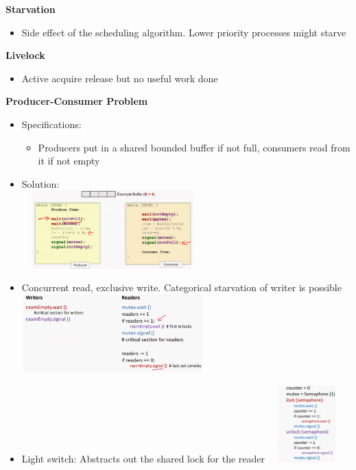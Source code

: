 \documentclass[10pt, landscape]{article}
\begin{document}
\begin{multicols}{4}
\textbf{Starvation}
\begin{itemize}
    \item Side effect of the scheduling algorithm. Lower priority processes might starve
\end{itemize}

\textbf{Livelock}
\begin{itemize}
    \item Active acquire release but no useful work done 
\end{itemize}
 
\textbf{Producer-Consumer Problem} \\
\begin{itemize}
    \item Specifications:
    \begin{itemize}
        \item Producers put in a shared bounded buffer if not full, consumers read from it if not empty
    \end{itemize}
    \item Solution:\\
    \includegraphics*[width = 7cm, height = 3cm]{producerConsumer.png} \\ 
    \item Concurrent read, exclusive write. Categorical starvation of writer is possible\\ 
    \includegraphics*[width = 7cm, height = 3cm]{readerwritter1.png} \\
    \item Light switch: Abstracts out the shared lock for the reader 
    \includegraphics*[width = 3cm, height = 3cm]{lightswitch.png} \\

\end{itemize}
\end{multicols}
\end{document}
